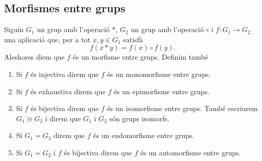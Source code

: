 \documentclass[../Apunts.tex]{subfiles}
\begin{document}
	\subsection{Morfismes entre grups}
	\begin{definition}
		\label{def:morfisme entre grups}
		\label{def:monomorfisme entre grups}
		\label{def:epimorfisme entre grups}
		\label{def:isomorfisme entre grups}
		\label{def:endomorfisme entre grups}
		\label{def:automorfisme entre grups}
		Siguin \(G_{1}\) un grup amb l'operació \(\ast\), \(G_{2}\) un grup amb l'operació \(\circ\) i \(f\colon G_{1}\to G_{2}\) una aplicació que, per a tot \(x,y\in G_{1}\) satisfà
		\[f(x\ast y)=f(x)\circ f(y).\]
		Aleshores diem que \(f\) és un morfisme entre grups. Definim també
		\begin{enumerate}
			\item Si \(f\) és injectiva direm que \(f\) és un monomorfisme entre grups.
			\item Si \(f\) és exhaustiva direm que \(f\) és un epimorfisme entre grups.
			\item Si \(f\) és bijectiva direm que \(f\) és un isomorfisme entre grups. També escriurem \(G_{1}\cong G_{2}\) i direm que \(G_{1}\) i \(G_{2}\) són grups isomorfs.
			\item Si \(G_{1}=G_{2}\) direm que \(f\) és un endomorfisme entre grups.
			\item Si \(G_{1}=G_{2}\) i \(f\) és bijectiva direm que \(f\) és un automorfisme entre grups.
		\end{enumerate}
	\end{definition}
\end{document}
